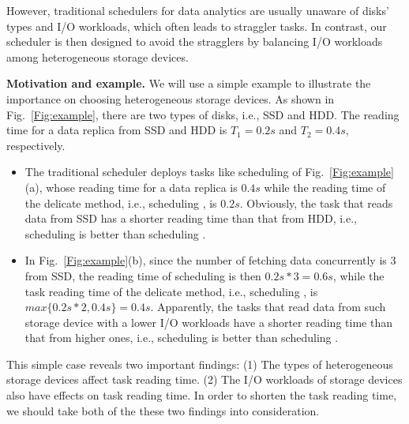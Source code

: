 \documentclass[conference]{IEEEtran}
\begin{document}
However, traditional schedulers for data analytics are usually unaware of disks' types and I/O workloads, which often leads to straggler tasks. In contrast, our scheduler is then designed to avoid the stragglers by balancing I/O workloads among heterogeneous storage devices.

\textbf{Motivation and example.}
We will use a simple example to illustrate the importance on choosing heterogeneous storage devices. As shown in Fig.~\ref{Fig:example}, there are two types of disks, i.e., SSD and HDD. The reading time for a data replica from SSD and HDD is $T_1 = 0.2s$ and $T_2 = 0.4s$, respectively. 
\begin{itemize}
	\item The traditional scheduler deploys tasks like scheduling \uppercase\expandafter{} of Fig.~\ref{Fig:example}(a), whose reading time for a data replica is $0.4s$ while the reading time of the delicate method, i.e., scheduling \uppercase\expandafter{}, is $0.2s$. Obviously, the task that reads data from SSD has a shorter reading time than that from HDD, i.e., scheduling \uppercase\expandafter{} is better than scheduling \uppercase\expandafter{}.

	\item In Fig.~\ref{Fig:example}(b), since the number of fetching data concurrently is 3 from SSD, the reading time of scheduling \uppercase\expandafter{} is then $0.2s * 3 = 0.6s$, while the task reading time of the delicate method, i.e., scheduling \uppercase\expandafter{}, is $max\{0.2s * 2, 0.4s\} = 0.4s$. Apparently, the tasks that read data from such storage device with a lower I/O workloads have a shorter reading time than that from higher ones, i.e., scheduling \uppercase\expandafter{} is better than scheduling \uppercase\expandafter{}.
\end{itemize}

This simple case reveals two important findings: (1) The types of heterogeneous storage devices affect task reading time. (2) The I/O workloads of storage devices also have effects on task reading time. In order to shorten the task reading time, we should take both of the these two findings into consideration.

\end{document}
